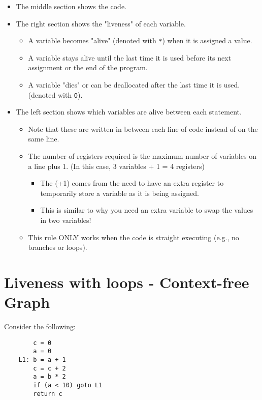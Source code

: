 \documentclass[10pt]{article}
\begin{document}
\begin{itemize}
    \item The middle section shows the code.
    \item The right section shows the "liveness" of each variable.
    \begin{itemize}
        \item A variable becomes "alive" (denoted with \texttt{*}) when it is assigned a value.
        \item A variable stays alive until the last time it is used before its next assignment or the end of the program.
        \item A variable "dies" or can be deallocated after the last time it is used.  (denoted with \texttt{O}).
    \end{itemize}   
    \item The left section shows which variables are alive between each statement.
    \begin{itemize}
        \item Note that these are written in between each line of code instead of on the same line.
        \item The number of registers required is the maximum number of variables on a line plus 1.  (In this case, 3 variables + 1 = 4 registers)
        \begin{itemize}
            \item The (+1) comes from the need to have an extra register to temporarily store a variable as it is being assigned.
            \item This is similar to why you need an extra variable to swap the values in two variables!
        \end{itemize}
        \item This rule ONLY works when the code is straight executing (e.g., no branches or loops).
    \end{itemize}
\end{itemize}

\section*{Liveness with loops - Context-free Graph}
Consider the following:
\begin{verbatim}
        c = 0
        a = 0
    L1: b = a + 1
        c = c + 2
        a = b * 2
        if (a < 10) goto L1
        return c
\end{verbatim}
\end{document}
